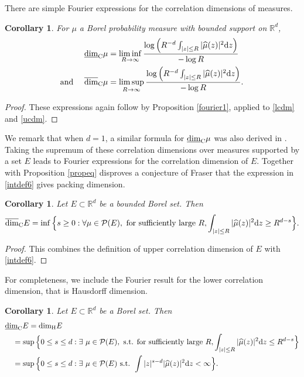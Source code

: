 \documentclass[12pt]{article}
\newcommand{\1}{{\bf 1}}
\newcommand\ucod{\overline{\mbox{\rm dim}}_{\rm C}} %
\newcommand\lcod{\underline{\mbox{\rm dim}}_{\rm C}} %
\newcommand\hdd{\mbox{\rm dim}_{\rm H}} %
\newtheorem{cor}[theo]{Corollary}
\begin{document}
There are simple Fourier expressions for the correlation dimensions of measures.
\begin{cor}\label{corcdmes}
For $\mu$ a Borel probability measure with bounded support on $\mathbb{R}^d$,
\begin{align}
\lcod\mu& = \liminf_{R \rightarrow \infty}\frac{\log \Big(R^{-d}  \int_{|z| \leq R} |{\widehat {\mu}(z)}|^2 \mathrm{d}z\Big)}{- \log R}\quad \label{intdef7} \\
\mbox{ and }\quad 
\displaystyle{\ucod } \mu & = \limsup_{R \rightarrow \infty}\frac{\log \Big(R^{-d} \int_{|z| \leq R} |{\widehat {\mu}(z)}|^2 \mathrm{d}z\Big)}{- \log R}.\label{intdef6} 
\end{align}
\end{cor}
\begin{proof}
These expressions again follow by Proposition \ref{fourier1}, applied to \eqref{lcdm} and \eqref{ucdm}. 
\end{proof}

We remark that  when $d=1$, a similar formula for $\lcod\mu$ was also derived in \cite{FNW}.
Taking the supremum of these correlation dimensions over measures supported by a set $E$  leads to Fourier expressions for the correlation dimension of $E$. Together with Proposition \ref{propeq} disproves a conjecture of Fraser \cite{Fr} that the expression in \eqref{intdef6} gives packing dimension.
\begin{cor}
Let $E \subset \mathbb{R}^d$ be a bounded Borel set. Then
\begin{equation*}
\ucod E= \inf\Big\{s \geq 0: \forall  \mu \in {\mathcal P}(E), \text{ for sufficiently large }R,  \int_{|z| \leq R} |{\widehat {\mu}(z)}|^2 \mathrm{d}z \geq R^{d-s } \Big\}. 
\end{equation*}
\end{cor}

\begin{proof}
This combines the definition of upper correlation dimension of $E$ with \eqref{intdef6}.
 \end{proof}

For completeness, we include the Fourier result for the lower correlation dimension, that is Hausdorff dimension.
\begin{cor}\label{haudim}
Let $E \subset \mathbb{R}^d$ be a Borel set. Then
\begin{align}
&\lcod E=\hdd E \nonumber\\
&\quad=\sup\Big\{0\leq s \leq d: \exists\  \mu \in {\mathcal P}(E), \text{ s.t. for sufficiently large }R, \int_{|z| \leq R} |{\widehat {\mu}(z)}|^2 \mathrm{d}z \leq R^{d-s} \Big\}\label{hauf1}\\
&\quad=\sup\Big\{0\leq s \leq d:  \exists\  \mu \in {\mathcal P}(E) \text{ s.t. } 
\int |z|^{s-d}|{\widehat {\mu}(z)}|^2 \mathrm{d}z <\infty\Big\}.\label{hauf2}
\end{align}
\end{cor}
\end{document}
